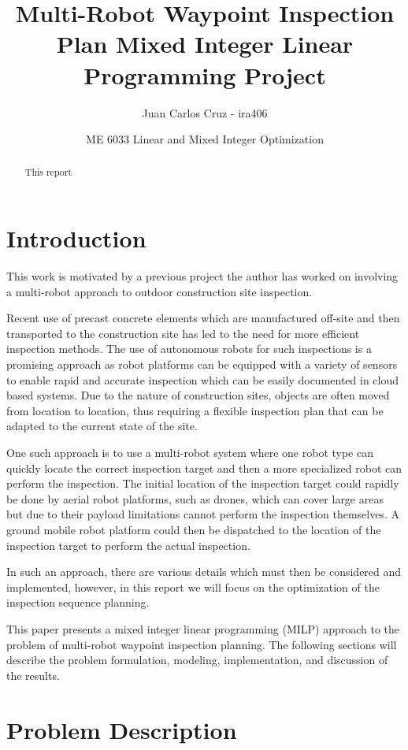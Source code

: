\documentclass{article}
\title{Multi-Robot Waypoint Inspection Plan Mixed Integer Linear Programming Project}
\author{Juan Carlos Cruz - ira406}
\date{ME 6033 Linear and Mixed Integer Optimization}
\begin{document}
	\maketitle
	\noindent%

	\begin{abstract}
		This report
	\end{abstract}

	\section{Introduction}\label{intro}

		This work is motivated by a previous project the author has worked on involving a multi-robot approach to outdoor construction site inspection. 

		Recent use of precast concrete elements which are manufactured off-site and then transported to the construction site has led to the need for more efficient inspection methods. 
		The use of autonomous robots for such inspections is a promising approach as robot platforms can be equipped with a variety of sensors to enable rapid and accurate inspection which can be easily documented in cloud based systems.
		Due to the nature of construction sites, objects are often moved from location to location, thus requiring a flexible inspection plan that can be adapted to the current state of the site.

		One such approach is to use a multi-robot system where one robot type can quickly locate the correct inspection target and then a more specialized robot can perform the inspection.
		The initial location of the inspection target could rapidly be done by aerial robot platforms, such as drones, which can cover large areas but due to their payload limitations cannot perform the inspection themselves.
		A ground mobile robot platform could then be dispatched to the location of the inspection target to perform the actual inspection.

		In such an approach, there are various details which must then be considered and implemented, however, in this report we will focus on the optimization of the inspection sequence planning. 

		This paper presents a mixed integer linear programming (MILP) approach to the problem of multi-robot waypoint inspection planning.
		The following sections will describe the problem formulation, modeling, implementation, and discussion of the results.


	\section{Problem Description}\label{prob_desc}
\end{document}
